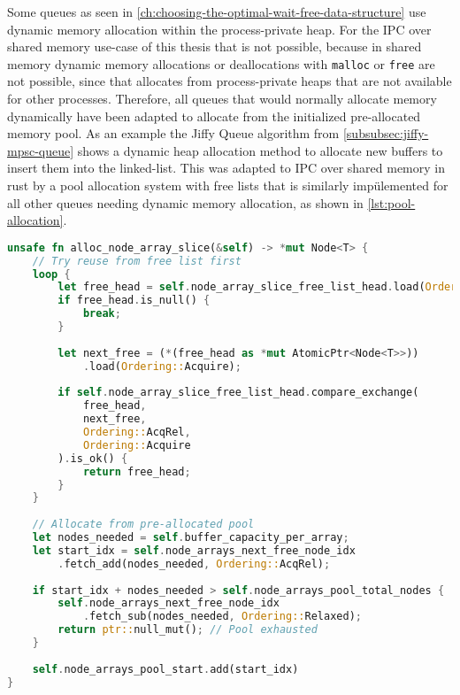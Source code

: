 Some queues as seen in \cref{ch:choosing-the-optimal-wait-free-data-structure} use dynamic memory allocation within the process-private heap. For the \ac{IPC} over shared memory use-case of this thesis that is not possible, because in shared memory dynamic memory allocations or deallocations with \texttt{malloc} or \texttt{free} are not possible, since that allocates from process-private heaps that are not available for other processes. Therefore, all queues that would normally allocate memory dynamically have been adapted to allocate from the initialized pre-allocated memory pool. As an example the Jiffy Queue algorithm from \cref{subsubsec:jiffy-mpsc-queue} shows a dynamic heap allocation method to allocate new buffers to insert them into the linked-list. This was adapted to \ac{IPC} over shared memory in rust by a pool allocation system with free lists that is similarly impülemented for all other queues needing dynamic memory allocation, as shown in \cref{lst:pool-allocation}.

\begin{lstlisting}[language=Rust, style=boxed, caption={Lock-free memory pool allocation}, label={lst:pool-allocation}]
unsafe fn alloc_node_array_slice(&self) -> *mut Node<T> {
    // Try reuse from free list first
    loop {
        let free_head = self.node_array_slice_free_list_head.load(Ordering::Acquire);
        if free_head.is_null() {
            break;
        }
        
        let next_free = (*(free_head as *mut AtomicPtr<Node<T>>))
            .load(Ordering::Acquire);
            
        if self.node_array_slice_free_list_head.compare_exchange(
            free_head, 
            next_free, 
            Ordering::AcqRel, 
            Ordering::Acquire
        ).is_ok() {
            return free_head;
        }
    }
    
    // Allocate from pre-allocated pool
    let nodes_needed = self.buffer_capacity_per_array;
    let start_idx = self.node_arrays_next_free_node_idx
        .fetch_add(nodes_needed, Ordering::AcqRel);
        
    if start_idx + nodes_needed > self.node_arrays_pool_total_nodes {
        self.node_arrays_next_free_node_idx
            .fetch_sub(nodes_needed, Ordering::Relaxed);
        return ptr::null_mut(); // Pool exhausted
    }
    
    self.node_arrays_pool_start.add(start_idx)
}
\end{lstlisting}

